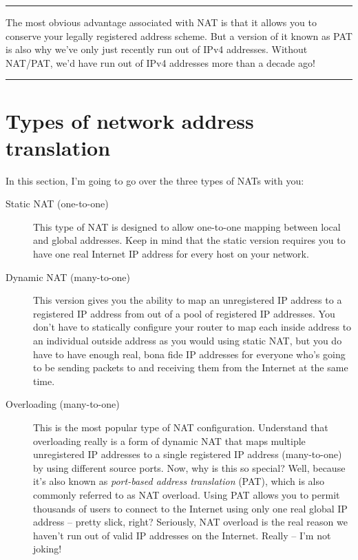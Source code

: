 \begin{center}\rule{0.5\linewidth}{0.5pt}\end{center}

The most obvious advantage associated with NAT is that it allows you to conserve your legally registered address scheme.
But a version of it known as PAT is also why we've only just recently run out of IPv4 addresses.
Without NAT/PAT, we'd have run out of IPv4 addresses more than a decade ago!

\begin{center}\rule{0.5\linewidth}{0.5pt}\end{center}



\section{Types of network address translation}

In this section, I'm going to go over the three types of NATs with you:
\begin{description}
   \item[Static NAT (one-to-one)]
      This type of NAT is designed to allow one-to-one mapping between local and global addresses.
      Keep in mind that the static version requires you to have one real Internet IP address for every host on your network.

   \item[Dynamic NAT (many-to-one)]
      This version gives you the ability to map an unregistered IP address to a registered IP address from out of a pool of registered IP addresses.
      You don't have to statically configure your router to map each inside address to an individual outside address as you would using static NAT, but you do have to have enough real, bona fide IP addresses for everyone who's going to be sending packets to and receiving them from the Internet at the same time.

   \item[Overloading (many-to-one)]
      This is the most popular type of NAT configuration.
      Understand that overloading really is a form of dynamic NAT that maps multiple unregistered IP addresses to a single registered IP address (many-to-one) by using different source ports.
      Now, why is this so special?
      Well, because it's also known as \emph{port-based address translation} (PAT), which is also commonly referred to as NAT overload.
      Using PAT allows you to permit thousands of users to connect to the Internet using only one real global IP address -- pretty slick, right?
      Seriously, NAT overload is the real reason we haven't run out of valid IP addresses on the Internet.
      Really -- I'm not joking!
\end{description}


